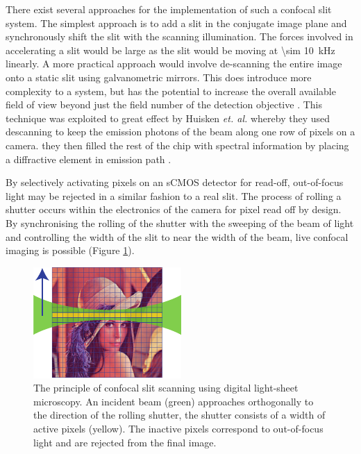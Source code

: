 There exist several approaches for the implementation of such a confocal slit system.
The simplest approach is to add a slit in the conjugate image plane and synchronously shift the slit with the scanning illumination.
The forces involved in accelerating a slit would be large as the slit would be moving at \SI{\sim 10}{\kilo\hertz} linearly.
A more practical approach would involve de-scanning the entire image onto a static slit using galvanometric mirrors.
This does introduce more complexity to a system, but has the potential to increase the overall available field of view beyond just the field number of the detection objective \cite{Huisken}.
This technique was exploited to great effect by Huisken \emph{et. al.} whereby they used descanning to keep the emission photons of the beam along one row of pixels on a camera.
they then filled the rest of the chip with spectral information by placing a diffractive element in emission path \cite{}.

By selectively activating pixels on an sCMOS detector for read-off, out-of-focus light may be rejected in a similar fashion to a real slit.
The process of rolling a shutter occurs within the electronics of the camera for pixel read off by design.
By synchronising the rolling of the shutter with the sweeping of the beam of light and controlling the width of the slit to near the width of the beam, live confocal imaging is possible (Figure \ref{fig:slit_scanning_alt}).

\begin{figure}
  \centering
  \includegraphics{slit_scanning_alt}
  \caption{The principle of confocal slit scanning using digital light-sheet microscopy.
  An incident beam (green) approaches orthogonally to the direction of the rolling shutter, the shutter consists of a width of active pixels (yellow).
  The inactive pixels correspond to out-of-focus light and are rejected from the final image.}
  \label{fig:slit_scanning_alt}
\end{figure}


